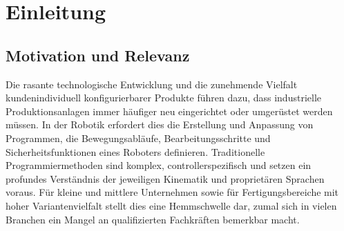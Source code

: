 

%

\chapter{Einleitung}
\label{cap:Einleitung}

\section{Motivation und Relevanz}
\label{sec:Motivation}

Die rasante technologische Entwicklung und die zunehmende Vielfalt
kundenindividuell konfigurierbarer Produkte führen dazu, dass
industrielle Produktionsanlagen immer häufiger neu eingerichtet oder
umgerüstet werden müssen. In der Robotik erfordert dies die
Erstellung und Anpassung von Programmen, die Bewegungsabläufe,
Bearbeitungsschritte und Sicherheitsfunktionen eines Roboters
definieren. Traditionelle Programmiermethoden sind komplex,
controllerspezifisch und setzen ein profundes Verständnis der
jeweiligen Kinematik und proprietären Sprachen voraus. Für kleine und
mittlere Unternehmen sowie für Fertigungsbereiche mit hoher
Variantenvielfalt stellt dies eine Hemmschwelle dar, zumal sich in
vielen Branchen ein Mangel an qualifizierten Fachkräften bemerkbar macht.

